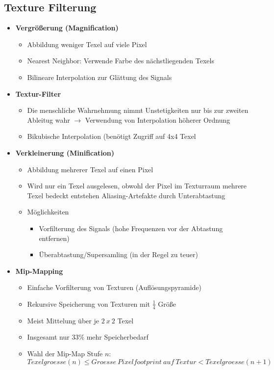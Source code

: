 \subsection{Texture Filterung}
\begin{itemize}
	\item \textbf{Vergrößerung (Magnification)}
	\begin{itemize}
		\item Abbildung weniger Texel auf viele Pixel
		\item Nearest Neighbor: Verwende Farbe des nächstliegenden Texels
		\item Bilineare Interpolation zur Glättung des Signals
	\end{itemize}
	\item \textbf{Textur-Filter}
	\begin{itemize}
		\item Die menschliche Wahrnehmung nimmt Unstetigkeiten nur bis zur zweiten Ableitug wahr \(\rightarrow\) Verwendung von Interpolation höherer Ordnung
		\item Bikubische Interpolation (benötigt Zugriff auf 4x4 Texel
	\end{itemize}
	\item \textbf{Verkleinerung (Minification)}
	\begin{itemize}
		\item Abbildung mehrerer Texel auf einen Pixel
		\item Wird nur ein Texel ausgelesen, obwohl der Pixel im Texturraum mehrere Texel bedeckt entstehen Aliasing-Artefakte durch Unterabtastung
		\item Möglichkeiten
		\begin{itemize}
			\item Vorfilterung des Signals (hohe Frequenzen vor der Abtastung entfernen)
			\item Überabtastung/Supersamling (in der Regel zu teuer)
		\end{itemize}
	\end{itemize}
	\item \textbf{Mip-Mapping}
	\begin{itemize}
		\item Einfache Vorfilterung von Texturen (Auflösungspyramide)
		\item Rekursive Speicherung von Texturen mit \(\frac{1}{4}\) Größe
		\item Meist Mittelung über je \(2~x~2\) Texel
		\item Insgesamt nur 33\% mehr Speicherbedarf
		\item Wahl der Mip-Map Stufe \(n\): \(Texelgroesse(n) \leq Groesse~Pixelfootprint~auf~Textur < Texelgroesse(n+1)\)

\end{itemize}
\end{itemize}
